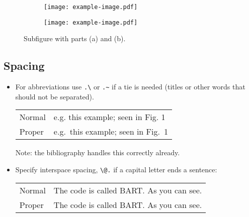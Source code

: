 \documentclass[10pt, letter]{article}
\begin{document}
\begin{figure}[h]
  \centering
  \begin{subfigure}[b]{0.2\textwidth}
    \texttt{[image: example-image.pdf]}
    \caption{}\label{fig:multifig_a}
  \end{subfigure}\hspace{10pt}
    \begin{subfigure}[b]{0.2\textwidth}
    \texttt{[image: example-image.pdf]}
    \caption{\label{fig:multifig_b}}
  \end{subfigure}
  \caption{Subfigure with parts (a) and (b).}
  \label{fig:multifig}
\end{figure}


\subsection{Spacing}
\begin{itemize}
\item For abbreviations use \verb|.\| or \verb|.~| if a tie is needed
  (titles or other words that should not be separated).
  \begin{center}
    \begin{tabular}[h!]{ll}
      Normal & e.g. this example; seen in Fig. 1 \\
      Proper & e.g.\ this example; seen in Fig.~1
    \end{tabular}
  \end{center}
  Note: the bibliography handles this correctly already.
\item Specify interspace spacing, \verb|\@.| if a capital letter ends
  a sentence:
    \begin{center}
    \begin{tabular}[h!]{ll} 
      Normal & The code is called BART. As you can see. \\
      Proper & The code is called BART\@. As you can see.
    \end{tabular}
  \end{center}
\end{itemize}  
\end{document}
